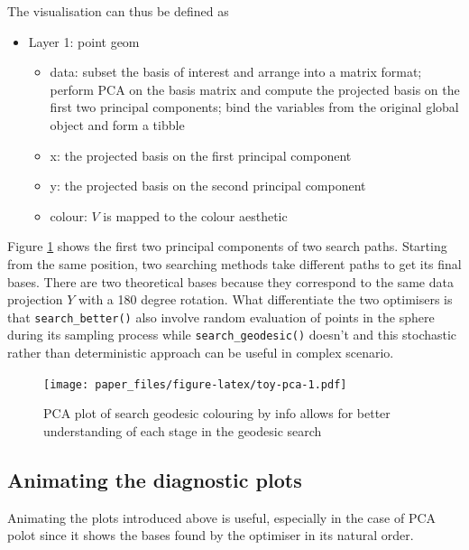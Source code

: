 \documentclass[12pt]{article}
\providecommand{\tightlist}{%
  \setlength{\itemsep}{0pt}\setlength{\parskip}{0pt}}
\begin{document}
The visualisation can thus be defined as

\begin{itemize}
\tightlist
\item
  Layer 1: point geom

  \begin{itemize}
  \tightlist
  \item
    data: subset the basis of interest and arrange into a matrix format; perform PCA on the basis matrix and compute the projected basis on the first two principal components; bind the variables from the original global object and form a tibble
  \item
    x: the projected basis on the first principal component
  \item
    y: the projected basis on the second principal component
  \item
    colour: \(V\) is mapped to the colour aesthetic
  \end{itemize}
\end{itemize}

Figure \ref{toy-pca} shows the first two principal components of two search paths. Starting from the same position, two searching methods take different paths to get its final bases. There are two theoretical bases because they correspond to the same data projection \(Y\) with a 180 degree rotation. What differentiate the two optimisers is that \texttt{search\_better()} also involve random evaluation of points in the sphere during its sampling process while \texttt{search\_geodesic()} doesn't and this stochastic rather than deterministic approach can be useful in complex scenario.

\begin{figure}
\centering
\texttt{[image: paper\_files/figure-latex/toy-pca-1.pdf]}
\caption{\label{fig:toy-pca}\label{toy-pca}PCA plot of search geodesic colouring by info allows for better understanding of each stage in the geodesic search}
\end{figure}

\hypertarget{animating-the-diagnostic-plots}{%
\subsection{Animating the diagnostic plots}\label{animating-the-diagnostic-plots}}

Animating the plots introduced above is useful, especially in the case of PCA polot since it shows the bases found by the optimiser in its natural order.
\end{document}

